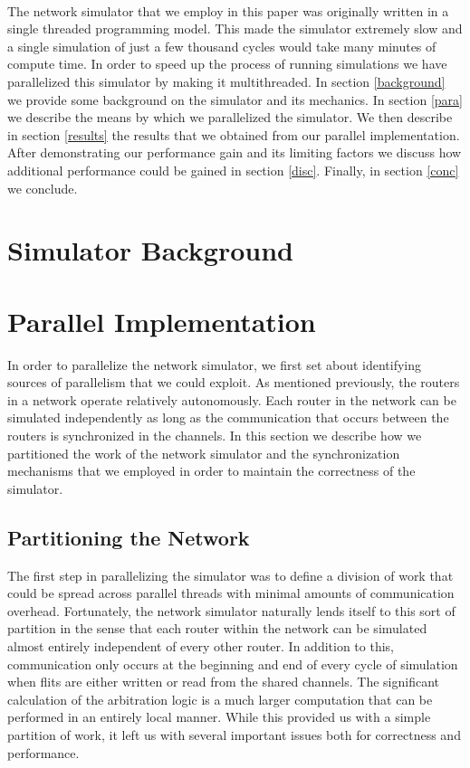 \documentclass[twocolumn]{article}
\begin{document}
~\\
The network simulator that we employ in this paper was originally written
in a single threaded programming model.  This made the simulator extremely
slow and a single simulation of just a few thousand cycles would take many
minutes of compute time.  In order to speed up the process of running
simulations we have parallelized this simulator by making it
multithreaded.  In section \ref{background} we provide some background on
the simulator and its mechanics.  In section \ref{para} we describe the
means by which we parallelized the simulator.  We then describe in section
\ref{results} the results that we obtained from our parallel
implementation.  After demonstrating our performance gain and its limiting
factors we discuss how additional performance could be gained in section
\ref{disc}.  Finally, in section \ref{conc} we conclude.

\section{Simulator Background \label{background}}


\section{Parallel Implementation \label{para}}
In order to parallelize the network simulator, we first set about
identifying sources of parallelism that we could exploit.  As mentioned previously, the routers in a network operate relatively autonomously.   Each router in the network can be simulated
independently as long as the communication that occurs between the routers
is synchronized in the channels.  In this section we describe how we
partitioned the work of the network simulator and the synchronization
mechanisms that we employed in order to maintain the correctness of the simulator.

\subsection{Partitioning the Network}
The first step in parallelizing the simulator was to define a division of
work that could be spread across parallel threads with minimal amounts of
communication overhead.  Fortunately, the network simulator naturally
lends itself to this sort of partition in the sense that each router
within the network can be simulated almost entirely independent of every
other router.  In addition to this, communication only occurs at the
beginning and end of every cycle of simulation when flits are either
written or read from the shared channels.  The significant
calculation of the arbitration logic is a much larger computation that
can be performed in an entirely local manner.  While this provided us with
a simple partition of work, it left us with several important issues both
for correctness and performance.
\end{document}
